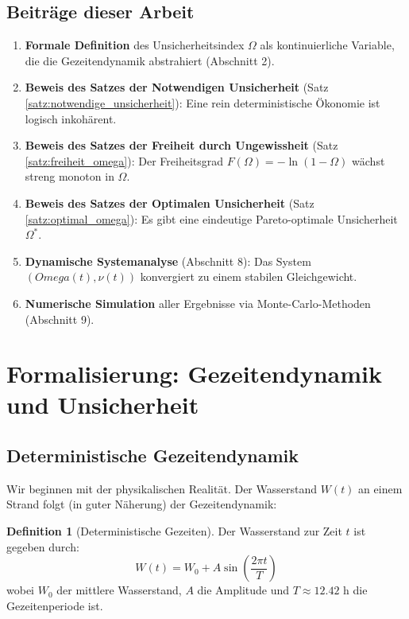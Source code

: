 \documentclass[a4paper,12pt]{article}
\theoremstyle{definition}
\newtheorem{definition}{Definition}
\begin{document}
\subsection{Beiträge dieser Arbeit}

\begin{enumerate}
    \item \textbf{Formale Definition} des Unsicherheitsindex $\Omega$ als kontinuierliche Variable, die die Gezeitendynamik abstrahiert (Abschnitt 2).
    
    \item \textbf{Beweis des Satzes der Notwendigen Unsicherheit} (Satz \ref{satz:notwendige_unsicherheit}): Eine rein deterministische Ökonomie ist logisch inkohärent.
    
    \item \textbf{Beweis des Satzes der Freiheit durch Ungewissheit} (Satz \ref{satz:freiheit_omega}): Der Freiheitsgrad $F(\Omega) = -\ln(1-\Omega)$ wächst streng monoton in $\Omega$.
    
    \item \textbf{Beweis des Satzes der Optimalen Unsicherheit} (Satz \ref{satz:optimal_omega}): Es gibt eine eindeutige Pareto-optimale Unsicherheit $\Omega^*$.
    
    \item \textbf{Dynamische Systemanalyse} (Abschnitt 8): Das System $(Omega(t), \nu(t))$ konvergiert zu einem stabilen Gleichgewicht.
    
    \item \textbf{Numerische Simulation} aller Ergebnisse via Monte-Carlo-Methoden (Abschnitt 9).
\end{enumerate}

\section{Formalisierung: Gezeitendynamik und Unsicherheit}

\subsection{Deterministische Gezeitendynamik}

Wir beginnen mit der physikalischen Realität. Der Wasserstand $W(t)$ an einem Strand folgt (in guter Näherung) der Gezeitendynamik:

\begin{definition}[Deterministische Gezeiten]
    Der Wasserstand zur Zeit $t$ ist gegeben durch:
    \begin{equation}
        W(t) = W_0 + A \sin\left(\frac{2\pi t}{T}\right)
    \end{equation}
    wobei $W_0$ der mittlere Wasserstand, $A$ die Amplitude und $T \approx 12.42$ h die Gezeitenperiode ist.
\end{definition}
\end{document}
